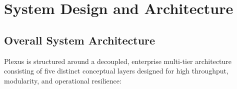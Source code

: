 \documentclass[11pt,a4paper,openany]{report}
\begin{document}
\chapter{System Design and Architecture}

\section{Overall System Architecture}
Plexus is structured around a decoupled, enterprise multi-tier architecture consisting of five distinct conceptual layers designed for high throughput, modularity, and operational resilience:
\end{document}
